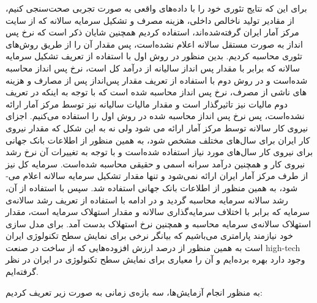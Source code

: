 \documentclass[11pt, fleqn]{article}
\begin{document}
\begin{multicols}{2}
	برای این که نتایج تئوری خود را با داده‌های واقعی به صورت تجربی صحت‌سنجی کنیم،‌ از 
مقادیر تولید ناخالص داخلی، هزینه مصرف و تشکیل سرمایه سالانه که از سایت مرکز آمار ایران 
\cite{s2}
گرفته‌شده‌اند، استفاده کردیم همچنین شایان ذکر است که نرخ پس­‌انداز به صورت مستقل سالانه اعلام نشده‌است، پس مقدار آن را از طریق روش­‌های تئوری محاسبه کردیم. بدین منظور در روش اول با استفاده از تعریف تشکیل سرمایه سالانه که برابر با مقدار پس انداز سالیانه از درآمد کل است، نرخ پس انداز محاسبه شده‌است و در روش دوم با استفاده از تعریف مقدار پس‌‌انداز پس از مصارف و هزینه­‌های ناشی از مصرف، نرخ پس انداز محاسبه شده است که با توجه به اینکه در تعریف دوم مالیات نیز تاثیرگذار است و مقدار مالیات­ سالیانه نیز توسط مرکز آمار ارائه نشده‌است، پس نرخ پس انداز محاسبه شده در روش اول را استفاده می­‌کنیم. اجزای نیروی کار سالانه توسط مرکز آمار ارائه می ­شود ولی نه به این شکل که مقدار نیروی کار ایران برای سال­‌های مختلف مشخص شود، به همین منظور از اطلاعات بانک جهانی
 \cite{s3}
 برای نیروی کار سال­‌های مورد نیاز استفاده شده‌است و با توجه به تغییرات آن نرخ رشد نیروی کار و همچنین درآمد سرانه اسمی  و حقیقی محاسبه شده‌است. سرمایه کل نیز از طرف مرکز آمار ایران ارائه نمی‌­شود و تنها مقدار تشکیل سرمایه سالانه اعلام می­ شود، به همین منظور از اطلاعات بانک جهانی استفاده شد. سپس با استفاده از آن، رشد سالانه سرمایه محاسبه گردید و در ادامه با استفاده از تعریف رشد سالانه‌ی سرمایه که برابر با اختلاف سرمایه‌گذاری سالانه و مقدار استهلاک سرمایه است، مقدار استهلاک سالانه‌ی سرمایه محاسبه و همچنین نرخ استهلاک بدست آمد. برای مدل سازی خود نیازمند پارامتری می­‌باشیم که بیانگر نرخی برای نمایش سطح تکنولوژی ایران است به همین منظور از درصد ارزش افزوده‌ه­ایی که از ساخت در صنعت high-tech وجود دارد بهره برده‌­ایم و آن را معیاری برای نمایش سطح تکنولوژی در ایران در نظر گرفته‌­ایم.
	
	
	
	
	
	
	
	
	
	
	
	
	
	
	
	
	
	
	
	
	




	
	
	
	
	
	
	


به منظور انجام آزمایش‌ها، سه بازه‌ی زمانی به صورت زیر  تعریف کردیم:



\end{multicols}
\end{document}
